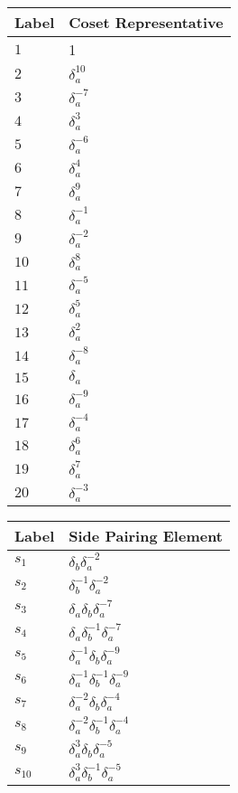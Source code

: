 \documentclass{article}
\begin{document}
\begin{center}
\begin{tabular}{ll}
\toprule
Label & Coset Representative\\
\midrule
$1$ & 1 \\
$2$ & $\delta_a^{10}$ \\
$3$ & $\delta_a^{-7}$ \\
$4$ & $\delta_a^{3}$ \\
$5$ & $\delta_a^{-6}$ \\
$6$ & $\delta_a^{4}$ \\
$7$ & $\delta_a^{9}$ \\
$8$ & $\delta_a^{-1}$ \\
$9$ & $\delta_a^{-2}$ \\
$10$ & $\delta_a^{8}$ \\
$11$ & $\delta_a^{-5}$ \\
$12$ & $\delta_a^{5}$ \\
$13$ & $\delta_a^{2}$ \\
$14$ & $\delta_a^{-8}$ \\
$15$ & $\delta_a^{}$ \\
$16$ & $\delta_a^{-9}$ \\
$17$ & $\delta_a^{-4}$ \\
$18$ & $\delta_a^{6}$ \\
$19$ & $\delta_a^{7}$ \\
$20$ & $\delta_a^{-3}$ \\
\bottomrule
\end{tabular}
\hfill
\begin{tabular}{ll}
\toprule
Label & Side Pairing Element\\
\midrule
$s_{1}$ & $\delta_b^{}\delta_a^{-2}$ \\
$s_{2}$ & $\delta_b^{-1}\delta_a^{-2}$ \\
$s_{3}$ & $\delta_a^{}\delta_b^{}\delta_a^{-7}$ \\
$s_{4}$ & $\delta_a^{}\delta_b^{-1}\delta_a^{-7}$ \\
$s_{5}$ & $\delta_a^{-1}\delta_b^{}\delta_a^{-9}$ \\
$s_{6}$ & $\delta_a^{-1}\delta_b^{-1}\delta_a^{-9}$ \\
$s_{7}$ & $\delta_a^{-2}\delta_b^{}\delta_a^{-4}$ \\
$s_{8}$ & $\delta_a^{-2}\delta_b^{-1}\delta_a^{-4}$ \\
$s_{9}$ & $\delta_a^{3}\delta_b^{}\delta_a^{-5}$ \\
$s_{10}$ & $\delta_a^{3}\delta_b^{-1}\delta_a^{-5}$ \\

\end{tabular}
\end{center}
\end{document}
